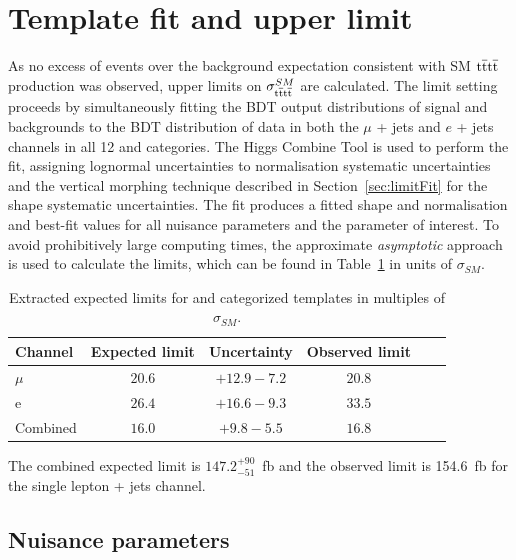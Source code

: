 \section{Template fit and upper limit}
\label{sec:limit13}
As no excess of events over the background expectation consistent with SM $\mathrm{t}\overline{\mathrm{t}}\mathrm{t}\overline{\mathrm{t}}$ production was observed, upper limits on $\sigma_{\mathrm{t}\overline{\mathrm{t}}\mathrm{t}\overline{\mathrm{t}}}^{SM}$ are calculated. 
The limit setting proceeds by simultaneously fitting the BDT output distributions of signal and backgrounds to the BDT distribution of data in both the $\mu$ + jets and $e$ + jets channels in all 12 \njets and \nMtags categories. The Higgs Combine Tool is used to perform the fit, assigning lognormal uncertainties to normalisation systematic uncertainties and the vertical morphing technique described in Section~\ref{sec:limitFit} for the shape systematic uncertainties. The fit produces a fitted shape and normalisation and best-fit values for all nuisance parameters and the parameter of interest. 
To avoid prohibitively large computing times, the approximate \emph{asymptotic} approach is used to calculate the \CLS limits, which can be found in Table~\ref{tab:limits} in units of $\sigma_{SM}$. 

\begin{table}[ht!]
\centering
\begin{tabular}{| l | c | c | c | c | c |}
  \hline
Channel  & Expected limit & Uncertainty & Observed limit\\
 \hline
$\mu$  &$20.6$ & $+12.9 -7.2$ & $20.8$ \\
 \hline
e  &  $26.4$ & $+16.6 -9.3$ & $33.5$ \\
 \hline
 Combined  &  $16.0$ & $+9.8 -5.5$ & $16.8$ \\
 \hline
\end{tabular}
 \caption{Extracted expected limits for \njets and \nMtags categorized templates in multiples of $\sigma_{SM}$.}
  \label{tab:limits}
  \end{table}

The combined expected limit is $147.2^{+90}_{-51}$~fb and the observed limit is 154.6~fb for the single lepton + jets channel.



\subsection{Nuisance parameters}

